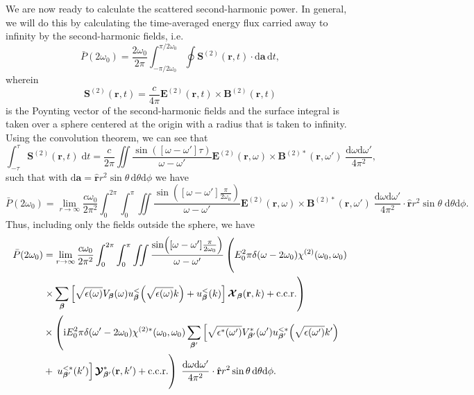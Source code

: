 \documentclass{article}
\begin{document}
We are now ready to calculate the scattered second-harmonic power. In general, we will do this by calculating the time-averaged energy flux carried away to infinity by the second-harmonic fields, i.e.
\begin{equation}
\bar{P}(2\omega_0) = \frac{2\omega_0}{2\pi}\int_{-\pi/2\omega_0}^{\pi/2\omega_0} \oint\mathbf{S}^{(2)}(\mathbf{r},t)\cdot\mathrm{d}\mathbf{a}\,\mathrm{d}t,
\end{equation}
wherein
\begin{equation}
\mathbf{S}^{(2)}(\mathbf{r},t) = \frac{c}{4\pi}\mathbf{E}^{(2)}(\mathbf{r},t)\times\mathbf{B}^{(2)}(\mathbf{r},t)
\end{equation}
is the Poynting vector of the second-harmonic fields and the surface integral is taken over a sphere centered at the origin with a radius that is taken to infinity. Using the convolution theorem, we can see that
\begin{equation}
\int_{-\tau}^\tau\mathbf{S}^{(2)}(\mathbf{r},t)\;\mathrm{d}t = \frac{c}{2\pi}\iint\frac{\sin([\omega - \omega']\tau)}{\omega - \omega'}\mathbf{E}^{(2)}(\mathbf{r},\omega)\times\mathbf{B}^{(2)*}(\mathbf{r},\omega')\;\frac{\mathrm{d}\omega\mathrm{d}\omega'}{4\pi^2},
\end{equation}
such that with $\mathrm{d}\mathbf{a} = \hat{\mathbf{r}}r^2\sin\theta\,\mathrm{d}\theta\mathrm{d}\phi$ we have
\begin{equation}
\bar{P}(2\omega_0) = \lim_{r\to\infty}\frac{c\omega_0}{2\pi^2}\int_0^{2\pi}\int_0^\pi\iint\frac{\sin([\omega - \omega']\frac{\pi}{2\omega_0})}{\omega - \omega'}\mathbf{E}^{(2)}(\mathbf{r},\omega)\times\mathbf{B}^{(2)*}(\mathbf{r},\omega')\;\frac{\mathrm{d}\omega\mathrm{d}\omega'}{4\pi^2}\cdot\hat{\mathbf{r}}r^2\sin\theta\;\mathrm{d}\theta\mathrm{d}\phi.
\end{equation}
Thus, including only the fields outside the sphere, we have
\begin{equation}
\begin{split}
\bar{P}(2\omega_0) &= \lim_{r\to\infty}\frac{c\omega_0}{2\pi^2}\int_0^{2\pi}\int_0^\pi\iint\frac{\sin([\omega - \omega']\frac{\pi}{2\omega_0})}{\omega - \omega'}\left( \vphantom{\sum_{\bm{\beta}}} E_0^2\pi\delta(\omega - 2\omega_0)\chi^{(2)}(\omega_0,\omega_0)\right.\\
&\left.\times\sum_{\bm{\beta}}\left[\sqrt{\epsilon(\omega)}V_{\bm{\beta}}(\omega)u_{\bm{\beta}}^<\!\left(\sqrt{\epsilon(\omega)}k\right) + u_{\bm{\beta}}^<(k)\right]\bm{\mathcal{X}}_{\bm{\beta}}(\mathbf{r},k) + \mathrm{c.c.r.}\right)\\
&\times\left(\mathrm{i}E_0^2\pi\delta(\omega' - 2\omega_0)\chi^{(2)*}(\omega_0,\omega_0)\sum_{\bm{\beta}'}\left[\sqrt{\epsilon^*(\omega')}V_{\bm{\beta}'}^*(\omega')u_{\bm{\beta}'}^{<*}\!\left(\sqrt{\epsilon(\omega')}k'\right)\right.\right.\\
&+ \left.\left.u_{\bm{\beta}'}^{<*}(k')\right]\bm{\mathcal{Y}}_{\bm{\beta}'}^*(\mathbf{r},k') + \mathrm{c.c.r.} \vphantom{\sum_{\bm{\beta}'}} \right)\;\frac{\mathrm{d}\omega\mathrm{d}\omega'}{4\pi^2}\cdot\hat{\mathbf{r}}r^2\sin\theta\,\mathrm{d}\theta\mathrm{d}\phi.
\end{split}
\end{equation}
\end{document}
